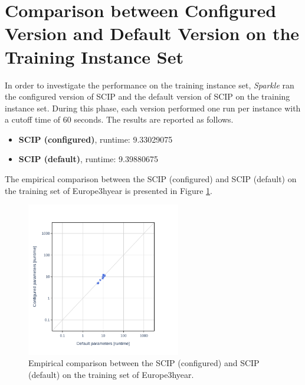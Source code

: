 \documentclass[british]{article}
\begin{document}
\vspace{5mm}


\section{Comparison between Configured Version and Default Version on the Training Instance Set}
In order to investigate the performance on the training instance set, \emph{Sparkle} ran the configured version of SCIP and the default version of SCIP on the training instance set. During this phase, each version performed one run per instance with a cutoff time of 60 seconds. The results are reported as follows.

\begin{itemize}
    \item \textbf{SCIP (configured)}, runtime: 9.33029075
    \item \textbf{SCIP (default)}, runtime: 9.39880675
\end{itemize}

The empirical comparison between the SCIP (configured) and SCIP (default) on the training set of Europe\textunderscore 3h\textunderscore year is presented in Figure \ref{fig:configured_vs_default_train}.

\begin{figure}[htbp]
\noindent \begin{centering}
\includegraphics[width=0.6\textwidth]{data_SCIP_configured_vs_default_on_Europe_3h_year}
\par\end{centering}

\caption{Empirical comparison between the SCIP (configured) and SCIP (default) on the training set of Europe\textunderscore 3h\textunderscore year.}\label{fig:configured_vs_default_train}
\end{figure}
\end{document}
